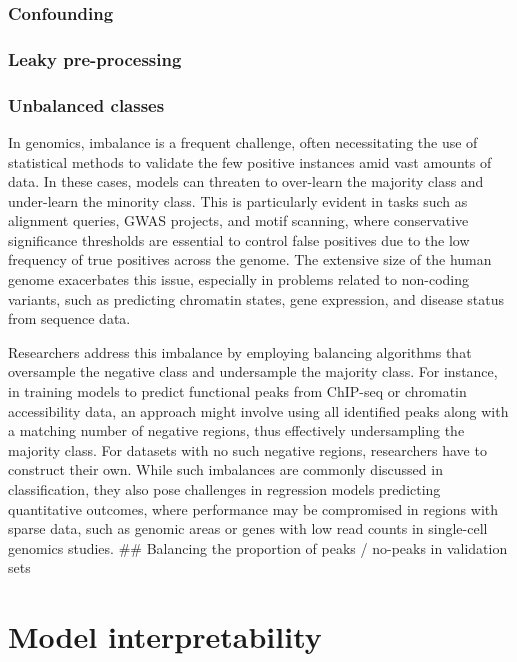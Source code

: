 \documentclass[
]{book}
\begin{document}
\section{Confounding}\label{confounding}

\section{Leaky pre-processing}\label{leaky-pre-processing}

\section{Unbalanced classes}\label{unbalanced-classes}

In genomics, imbalance is a frequent challenge, often necessitating the use of statistical methods to validate the few positive instances amid vast amounts of data. In these cases, models can threaten to over-learn the majority class and under-learn the minority class. This is particularly evident in tasks such as alignment queries, GWAS projects, and motif scanning, where conservative significance thresholds are essential to control false positives due to the low frequency of true positives across the genome. The extensive size of the human genome exacerbates this issue, especially in problems related to non-coding variants, such as predicting chromatin states, gene expression, and disease status from sequence data.

Researchers address this imbalance by employing balancing algorithms that oversample the negative class and undersample the majority class. For instance, in training models to predict functional peaks from ChIP-seq or chromatin accessibility data, an approach might involve using all identified peaks along with a matching number of negative regions, thus effectively undersampling the majority class. For datasets with no such negative regions, researchers have to construct their own. While such imbalances are commonly discussed in classification, they also pose challenges in regression models predicting quantitative outcomes, where performance may be compromised in regions with sparse data, such as genomic areas or genes with low read counts in single-cell genomics studies.
\#\# Balancing the proportion of peaks / no-peaks in validation sets

\part{Model interpretability}\label{part-model-interpretability}
\end{document}

